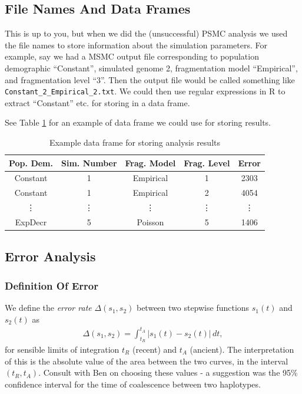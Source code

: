 \documentclass[11pt,a4paper]{article}
\begin{document}
\subsection{File Names And Data Frames}
This is up to you, but when we did the (unsuccessful) PSMC analysis we used the file names to store information about the simulation parameters. For example, say we had a MSMC output file corresponding to population demographic ``Constant'', simulated genome 2, fragmentation model ``Empirical'', and fragmentation level ``3''. Then the output file would be called something like \texttt{Constant\_2\_Empirical\_2.txt}. We could then use regular expressions in R to extract ``Constant'' etc. for storing in a data frame.

See Table \ref{df} for an example of data frame we could use for storing results.
\begin{table}[h]
	\caption{Example data frame for storing analysis results}
	\begin{center}
		\begin{tabular}{ccccc}
			\hline
			\textbf{Pop. Dem.} & \textbf{Sim. Number} & \textbf{Frag. Model} & \textbf{Frag. Level} & \textbf{Error} \\
                        \hline
                        Constant & 1 & Empirical & 1 & 2303 \\
                        Constant & 1 & Empirical & 2 & 4054 \\
                        \vdots & \vdots & \vdots & \vdots & \vdots \\
                        ExpDecr & 5 & Poisson & 5 & 1406 \\ \hline
		\end{tabular}
	\end{center} \label{df}
\end{table}


\subsection{Error Analysis}

\subsubsection{Definition Of Error}
We define the \emph{error rate} $\Delta (s_1,s_2)$ between two stepwise functions $s_1(t)$ and $s_2(t)$ as 
\begin{eqnarray}
\Delta (s_1,s_2) = \int_{t_R}^{t_A} |s_1(t)-s_2(t)| \,dt, \label{errorRate}
\end{eqnarray}
for sensible limits of integration $t_R$ (recent) and $t_A$ (ancient). The interpretation of this is the absolute value of the area between the two curves, in the interval $(t_R,t_A)$. Consult with Ben on choosing these values - a suggestion was the 95\% confidence interval for the time of coalescence between two haplotypes.
\end{document}
